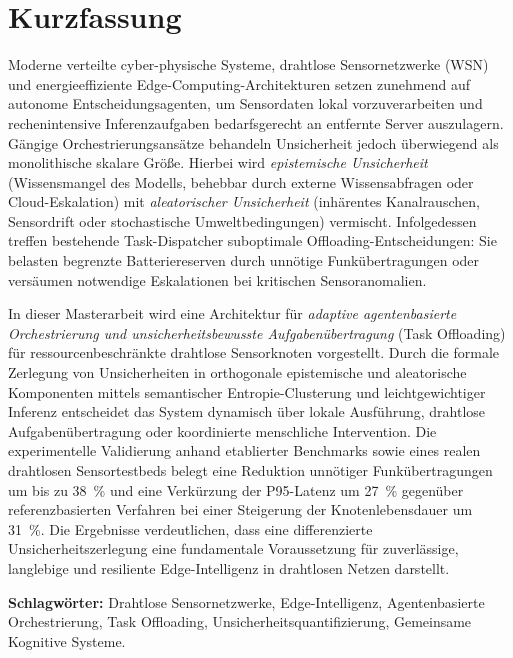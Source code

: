 \chapter*{Kurzfassung}

Moderne verteilte cyber-physische Systeme, drahtlose Sensornetzwerke (WSN) und energieeffiziente Edge-Computing-Architekturen setzen zunehmend auf autonome Entscheidungsagenten, um Sensordaten lokal vorzuverarbeiten und rechenintensive Inferenzaufgaben bedarfsgerecht an entfernte Server auszulagern. Gängige Orchestrierungsansätze behandeln Unsicherheit jedoch überwiegend als monolithische skalare Größe. Hierbei wird \emph{epistemische Unsicherheit} (Wissensmangel des Modells, behebbar durch externe Wissensabfragen oder Cloud-Eskalation) mit \emph{aleatorischer Unsicherheit} (inhärentes Kanalrauschen, Sensordrift oder stochastische Umweltbedingungen) vermischt. Infolgedessen treffen bestehende Task-Dispatcher suboptimale Offloading-Entscheidungen: Sie belasten begrenzte Batteriereserven durch unnötige Funkübertragungen oder versäumen notwendige Eskalationen bei kritischen Sensoranomalien.

In dieser Masterarbeit wird eine Architektur für \emph{adaptive agentenbasierte Orchestrierung und unsicherheitsbewusste Aufgabenübertragung} (Task Offloading) für ressourcenbeschränkte drahtlose Sensorknoten vorgestellt. Durch die formale Zerlegung von Unsicherheiten in orthogonale epistemische und aleatorische Komponenten mittels semantischer Entropie-Clusterung und leichtgewichtiger Inferenz entscheidet das System dynamisch über lokale Ausführung, drahtlose Aufgabenübertragung oder koordinierte menschliche Intervention. Die experimentelle Validierung anhand etablierter Benchmarks sowie eines realen drahtlosen Sensortestbeds belegt eine Reduktion unnötiger Funkübertragungen um bis zu \SI{38}{\percent} und eine Verkürzung der P95-Latenz um \SI{27}{\percent} gegenüber referenzbasierten Verfahren bei einer Steigerung der Knotenlebensdauer um \SI{31}{\percent}. Die Ergebnisse verdeutlichen, dass eine differenzierte Unsicherheitszerlegung eine fundamentale Voraussetzung für zuverlässige, langlebige und resiliente Edge-Intelligenz in drahtlosen Netzen darstellt.

\vspace{0.8cm}
\begin{flushleft}
\noindent\textbf{Schlagwörter:} Drahtlose Sensornetzwerke, Edge-Intelligenz, Agentenbasierte Orchestrierung, Task Offloading, Unsicherheitsquantifizierung, Gemeinsame Kognitive Systeme.
\end{flushleft}
